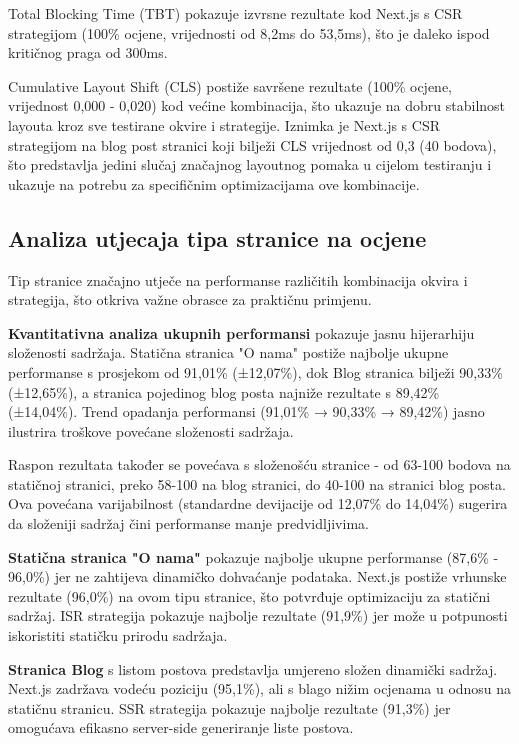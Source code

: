 Total Blocking Time (TBT) pokazuje izvrsne rezultate kod Next.js s CSR strategijom (100\% ocjene, vrijednosti od 8,2ms do 53,5ms), što je daleko ispod kritičnog praga od 300ms.

Cumulative Layout Shift (CLS) postiže savršene rezultate (100\% ocjene, vrijednost 0,000 - 0,020) kod većine kombinacija, što ukazuje na dobru stabilnost layouta kroz sve testirane okvire i strategije. Iznimka je Next.js s CSR strategijom na blog post stranici koji bilježi CLS vrijednost od 0,3 (40 bodova), što predstavlja jedini slučaj značajnog layoutnog pomaka u cijelom testiranju i ukazuje na potrebu za specifičnim optimizacijama ove kombinacije.

\subsection{Analiza utjecaja tipa stranice na ocjene}

Tip stranice značajno utječe na performanse različitih kombinacija okvira i strategija, što otkriva važne obrasce za praktičnu primjenu.

\textbf{Kvantitativna analiza ukupnih performansi} pokazuje jasnu hijerarhiju složenosti sadržaja. Statična stranica "O nama" postiže najbolje ukupne performanse s prosjekom od 91,01\% (±12,07\%), dok Blog stranica bilježi 90,33\% (±12,65\%), a stranica pojedinog blog posta najniže rezultate s 89,42\% (±14,04\%). Trend opadanja performansi (91,01\% → 90,33\% → 89,42\%) jasno ilustrira troškove povećane složenosti sadržaja.

Raspon rezultata također se povećava s složenošću stranice - od 63-100 bodova na statičnoj stranici, preko 58-100 na blog stranici, do 40-100 na stranici blog posta. Ova povećana varijabilnost (standardne devijacije od 12,07\% do 14,04\%) sugerira da složeniji sadržaj čini performanse manje predvidljivima.

\textbf{Statična stranica "O nama"} pokazuje najbolje ukupne performanse (87,6\% - 96,0\%) jer ne zahtijeva dinamičko dohvaćanje podataka. Next.js postiže vrhunske rezultate (96,0\%) na ovom tipu stranice, što potvrđuje optimizaciju za statični sadržaj. ISR strategija pokazuje najbolje rezultate (91,9\%) jer može u potpunosti iskoristiti statičku prirodu sadržaja.

\textbf{Stranica Blog} s listom postova predstavlja umjereno složen dinamički sadržaj. Next.js zadržava vodeću poziciju (95,1\%), ali s blago nižim ocjenama u odnosu na statičnu stranicu. SSR strategija pokazuje najbolje rezultate (91,3\%) jer omogućava efikasno server-side generiranje liste postova.

